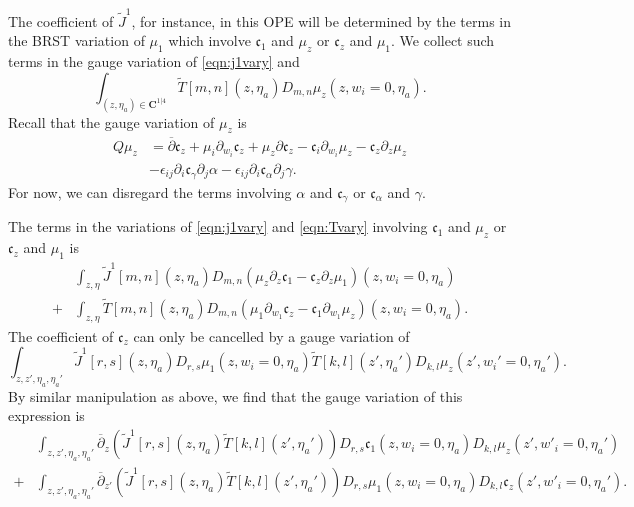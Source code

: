 \documentclass[11pt]{amsart}
\newcommand{\dbar}{\br{\partial}}
\newcommand{\til}{\widetilde}
\newcommand{\br}{\overline}
\newcommand{\CC}{\mathbf C}
\newcommand{\mf}{\mathfrak}
\theoremstyle{thm}
\numberwithin{equation}{subsection}
\theoremstyle{def}
\theoremstyle{rem}
\newcommand{\fc}{\mf{c}}
\begin{document}
The coefficient of $\til{J}^1$, for instance, in this OPE will be determined by the terms in the BRST variation of $\mu_1$ which involve $\fc_1$ and $\mu_z$ or $\fc_z$ and $\mu_1$. 
We collect such terms in the gauge variation of \eqref{eqn:j1vary} and 
\begin{equation}\label{eqn:Tvary}
\int_{(z,\eta_a) \in \CC^{1|4}} \til{T} [m,n] (z,\eta_a) D_{m,n} \mu_z(z, w_i=0, \eta_a) .
\end{equation}
Recall that the gauge variation of $\mu_z$ is
\begin{align*}
Q \mu_z & = \dbar \fc_z + \mu_i \partial_{w_i} \fc_z + \mu_z \partial \fc_z - \fc_i \partial_{w_i} \mu_z - \fc_z \partial_z \mu_z \\
& -\epsilon_{ij} \partial_i \fc_\gamma \partial_j \alpha - \epsilon_{ij} \partial_i \fc_\alpha \partial_j \gamma .
\end{align*}
For now, we can disregard the terms involving $\alpha$ and $\fc_\gamma$ or $\fc_\alpha$ and $\gamma$.

The terms in the variations of \eqref{eqn:j1vary} and \eqref{eqn:Tvary} involving $\fc_1$ and $\mu_z$ or $\fc_z$ and $\mu_1$ is
\begin{align*}
& \int_{z, \eta} \til{J}^1[m,n](z,\eta_a) D_{m,n} (\mu_z \partial_{z} \fc_1 - \fc_z \partial_z \mu_1) (z, w_i=0,\eta_a) \\
+ & \int_{z,\eta} \til{T} [m,n](z,\eta_a) D_{m,n}(\mu_1 \partial_{w_1} \fc_z - \fc_1 \partial_{w_1} \mu_z) (z, w_i=0, \eta_a).
\end{align*}
The coefficient of $\fc_z$ can only be cancelled by a gauge variation of 
\[
\int_{z,z',\eta_a,\eta_a'} \til{J}^1 [r,s] (z,\eta_a) D_{r,s} \mu_1(z,w_i=0,\eta_a) \til{T} [k,l] (z',\eta_a') D_{k,l} \mu_z(z',w_i'=0,\eta_a') .
\]
By similar manipulation as above, we find that the gauge variation of this expression is 
\begin{align*}
& \int_{z,z',\eta_a,\eta_a'} \dbar_{z} \left(\til{J}^1 [r,s] (z,\eta_a) \til{T}[k,l](z',\eta_a')\right) D_{r,s} \fc_1 (z,w_i=0,\eta_a) D_{k,l} \mu_z (z',w'_i=0,\eta_a') \\
+ & \int_{z,z',\eta_a,\eta_a'} \dbar_{z'} \left(\til{J}^1 [r,s] (z,\eta_a) \til{T}[k,l](z',\eta_a')\right) D_{r,s} \mu_1 (z,w_i=0,\eta_a) D_{k,l} \fc_z (z',w'_i=0,\eta_a').
\end{align*}
\end{document}
